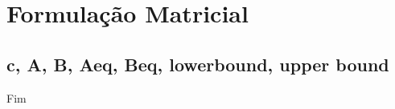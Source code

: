 \documentclass{beamer}
\begin{document}
\section{Formulação Matricial}
\subsection{c, A, B, Aeq, Beq, lowerbound, upper bound}


\begin{frame}
\Huge{\centerline{Fim}}
\end{frame}

\end{document}
